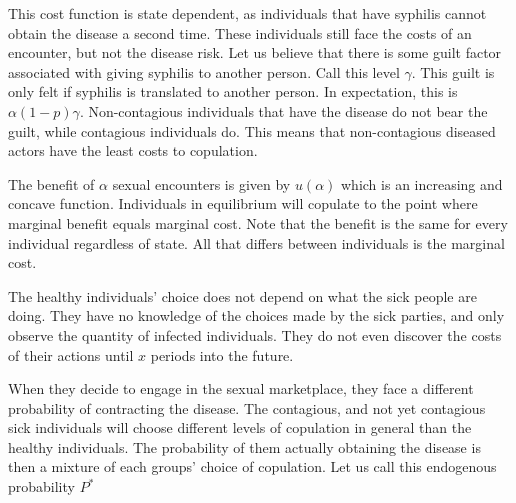 \documentclass[12pt]{paper}
\begin{document}
This cost function is state dependent, as individuals that have
syphilis cannot obtain the disease a second time. These individuals
still face the costs of an encounter, but not the disease risk. Let us
believe that there is some guilt factor associated with giving
syphilis to another person. Call this level $\gamma$. This guilt is only
felt if syphilis is translated to another person. In expectation, this
is $\alpha ( 1 - p)\gamma$.  Non-contagious individuals that have the disease do
not bear the guilt, while contagious individuals do. This means that
non-contagious diseased actors have the least costs to
copulation. 

The benefit of $\alpha$ sexual encounters is given by $u(\alpha)$ which is an
increasing and concave function. Individuals in equilibrium will
copulate to the point where marginal benefit equals marginal
cost. Note that the benefit is the same for every individual
regardless of state. All that differs between individuals is the
marginal cost.



The healthy individuals' choice does not depend on what the sick
people are doing. They have no knowledge of the choices made by the
sick parties, and only observe the quantity of infected
individuals. They do not even discover the costs of their actions
until $x$ periods into the future. 

When they decide to engage in the sexual marketplace, they
face a different probability of contracting the disease. The
contagious, and not yet contagious sick individuals will choose
different levels of copulation in general than the healthy
individuals. The probability of them actually obtaining the disease is
then a mixture of each groups' choice of copulation. Let us call this
endogenous probability $P^{*}$
\end{document}
